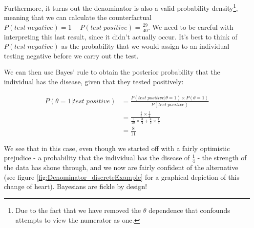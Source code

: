 \documentclass[11pt,fullpage]{book}
\begin{document}
Furthermore, it turns out the denominator is also a valid probability density\footnote{Due to the fact that we have removed the $\theta$ dependence that confounds attempts to view the numerator as one.}, meaning that we can calculate the counterfactual $P(test\; negative) = 1 - P(test\; positive) = \frac{29}{40}$. We need to be careful with interpreting this last result, since it didn't actually occur. It's best to think of $P(test\; negative)$ as the probability that we would assign to an individual testing negative before we carry out the test.

We can then use Bayes' rule to obtain the posterior probability that the individual has the disease, given that they tested positively:

\begin{equation}\label{eq:Denominator_discreteExamplePosterior}
\begin{align}
P(\theta=1|test\; positive) &= \frac{P(test\; positive|\theta=1)\times P(\theta=1)}{P(test\; positive)}\\
&= \frac{\frac{4}{5} \times \frac{1}{4}}{\frac{1}{10} \times \frac{3}{4} + \frac{4}{5} \times \frac{1}{4}}\\
&= \frac{8}{11}
\end{align}
\end{equation}

We see that in this case, even though we started off with a fairly optimistic prejudice - a probability that the individual has the disease of $\frac{1}{4}$ - the strength of the data has shone through, and we now are fairly confident of the alternative (see figure \ref{fig:Denominator_discreteExample} for a graphical depiction of this change of heart). Bayesians are fickle by design!
\end{document}

